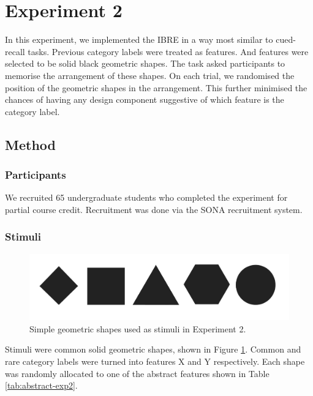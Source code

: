 \documentclass[10pt,letterpaper]{article}
\begin{document}
\section{Experiment 2}

In this experiment, we implemented the IBRE in a way most similar to cued-recall tasks.
Previous category labels were treated as features.
And features were selected to be solid black geometric shapes.
The task asked participants to memorise the arrangement of these shapes.
On each trial, we randomised the position of the geometric shapes in the arrangement.
This further minimised the chances of having any design component suggestive of which feature is the category label.

\subsection{Method}

\subsubsection{Participants}

We recruited 65 undergraduate students who completed the experiment for partial course credit.
Recruitment was done via the SONA recruitment system. \\

\subsubsection{Stimuli}

\begin{figure}
  \begin{center}
    \caption{Simple geometric shapes used as stimuli in Experiment 2.}
    \label{figure:exp2-stimuli}
    \includegraphics[scale=0.15]{figures/experiment_2_stimuli.pdf}
  \end{center}
\end{figure}

Stimuli were common solid geometric shapes, shown in Figure \ref*{figure:exp2-stimuli}.
Common and rare category labels were turned into features X and Y respectively.
Each shape was randomly allocated to one of the abstract features shown in Table \ref*{tab:abstract-exp2}.
\end{document}
